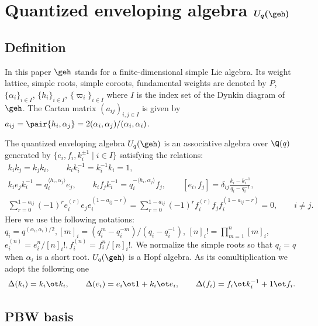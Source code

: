 \section[Quantized enveloping algebra $U_q(\geh)$]{Quantized enveloping algebra $\boldsymbol{U_q(\geh)}$}\label{a:sec2}

\subsection{Def\/inition}

In this paper $\geh$ stands for a f\/inite-dimensional simple Lie algebra.
Its weight lattice, simple roots, simple coroots, fundamental weights are
denoted by $P$, $\{\alpha_i\}_{i\in I}$, $\{h_i\}_{i\in I}$, $\{\varpi_i\}_{i\in I}$
where $I$ is the index set of the Dynkin diagram of~$\geh$.
The Cartan matrix $(a_{ij})_{i,j\in I}$ is given by
$a_{ij}=\pair{h_i,\alpha_j}=2(\alpha_i, \alpha_j)/(\alpha_i,\alpha_i)$.

The quantized enveloping algebra $U_q(\geh)$ is an associative algebra over $\Q(q)$ generated by
$\{e_i, f_i, k_i^{\pm1} \mid i\in I\}$ satisfying the relations:
\begin{gather}
 k_i k_j=k_j k_i, \qquad
k_i k_i^{-1}=k_i^{-1}k_i=1, \nonumber
\\
 k_i e_j k_i^{-1}=q_i^{\langle h_i,\alpha_j \rangle} e_j, \qquad
k_i f_j k_i^{-1}=q_i^{-\langle h_i, \alpha_j \rangle} f_j, \qquad
[e_i, f_j]=\delta_{ij}\frac{k_i-k_i^{-1}}{q_i-q_i^{-1}}, \nonumber
\\
 \sum_{r=0}^{1-a_{ij}} (-1)^r e_i^{(r)} e_j e_i^{(1-a_{ij}-r)}
=\sum_{r=0}^{1-a_{ij}} (-1)^r f_i^{(r)} f_j f_i^{(1-a_{ij}-r)}=0,\qquad i\neq j.\label{a:serre}
\end{gather}
Here we use the following notations:
$q_i=q^{(\alpha_i,\alpha_i)/2},[m]_i=(q_i^m-q_i^{-m})/(q_i-q_i^{-1})$,
$[n]_i!=\prod\limits_{m=1}^n[m]_i$, $e_i^{(n)}=e_i^n/[n]_i!,f_i^{(n)}=f_i^n/[n]_i!$.
We normalize the simple roots so that $q_i=q$ when
$\alpha_i$ is a short root.
$U_q(\geh)$ is a Hopf algebra. As its comultiplication we adopt the following one
\begin{gather*}
\Delta(k_i)=k_i\ot k_i,\qquad \Delta(e_i)=e_i\ot1+k_i\ot e_i,\qquad \Delta(f_i)=f_i\ot k_i^{-1}+1\ot f_i.
\end{gather*}

\subsection{PBW basis}\label{a:ss:pbw}

